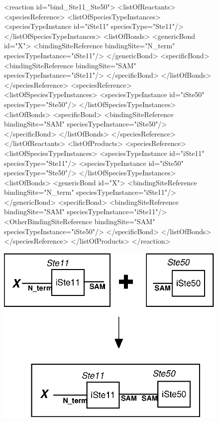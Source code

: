 \documentclass{cekarticle}
\begin{document}
\begin{figure}[h]
\begin{example}
<reaction id="bind_Ste11_Ste50">
    <listOfReactants>
        <speciesReference>
            <listOfSpeciesTypeInstances>
                <speciesTypeInstance id="iSte11" speciesType="Ste11"/>
            </listOfSpeciesTypeInstances>
            <listOfBonds>
                <genericBond id="X">
                    <bindingSiteReference bindingSite="N_term" speciesTypeInstance="iSte11"/>
                </genericBond>
                <specificBond>
                    <bindingSiteReference bindingSite="SAM" speciesTypeInstance="iSte11"/>
                </specificBond>
            </listOfBonds>
        </speciesReference>
        <speciesReference>
            <listOfSpeciesTypeInstances>
                <speciesTypeInstance id="iSte50" speciesType="Ste50"/>
            </listOfSpeciesTypeInstances>
            <listOfBonds>
                <specificBond>
                    <bindingSiteReference bindingSite="SAM" speciesTypeInstance="iSte50"/>
                </specificBond>
            </listOfBonds>
        </speciesReference>
    </listOfReactants>
    <listOfProducts>
        <speciesReference>
            <listOfSpeciesTypeInstances>
                <speciesTypeInstance id="iSte11" speciesType="Ste11"/>
                <speciesTypeInstance id="iSte50" speciesType="Ste50"/>
            </listOfSpeciesTypeInstances>
            <listOfBonds>
                <genericBond id="X">
                    <bindingSiteReference bindingSite="N_term" speciesTypeInstance="iSte11"/>
                </genericBond>
                <specificBond>
                    <bindingSiteReference bindingSite="SAM" speciesTypeInstance="iSte11"/>
                    <OtherBindingSiteReference
                        bindingSite="SAM" speciesTypeInstance="iSte50"/>
                </specificBond>
            </listOfBonds>
        </speciesReference>
    </listOfProducts>
</reaction>
\end{example}
  \vspace*{8pt}
  \centering
  \includegraphics[scale = 0.7]{bind_Ste11_Ste50.eps}

\end{figure}
\end{document}
